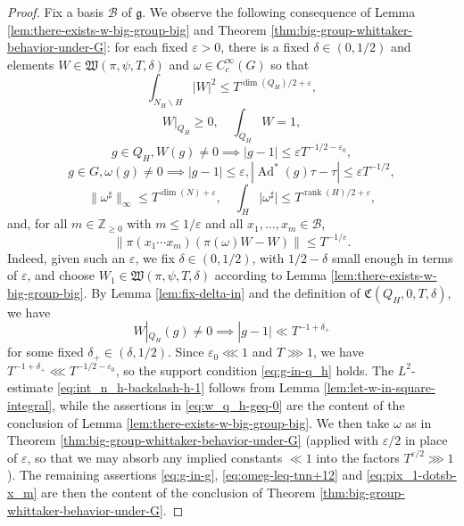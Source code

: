 \documentclass[reqno]{amsart}
\DeclareMathOperator{\Ad}{Ad}
\def\eps{\varepsilon}
\DeclareMathOperator{\rank}{rank}
\theoremstyle{plain} \newtheorem{theorem} {Theorem}
\theoremstyle{definition} \newtheorem{definition} [theorem] {Definition}
\theoremstyle{itplain} %
\numberwithin{equation}{section}
\numberwithin{theorem}{section}
\renewcommand{\geq}{\geqslant}
\renewcommand{\leq}{\leqslant}
\begin{document}
\begin{proof}
  Fix a basis $\mathcal{B}$ of $\mathfrak{g}$.  We observe the following consequence of Lemma \ref{lem:there-exists-w-big-group-big} and Theorem \ref{thm:big-group-whittaker-behavior-under-G}: for each fixed $\eps > 0$, there is a fixed $\delta \in (0,1/2)$ and elements $W \in \mathfrak{W}(\pi,\psi,T,\delta)$ and $\omega \in C_c^\infty(G)$ so that
  \begin{equation}\label{eq:int_n_h-backslash-h-1}
    \int_{N_H \backslash H} |W|^2 \leq   T^{\dim(Q_H)/2 + \eps},
  \end{equation}
  \begin{equation}\label{eq:w_q_h-geq-0}
    W|_{Q_H} \geq 0, \quad \int_{Q_H} W =  1,
  \end{equation}
  \begin{equation}\label{eq:g-in-q_h}
    g \in Q_H, W(g) \neq 0 \implies |g - 1| \leq \eps T^{-1/2-\eps_0},
  \end{equation}
  \begin{equation}\label{eq:g-in-g}
    g \in G, \omega(g) \neq 0 \implies |g - 1| \leq \eps, |\Ad^*(g) \tau - \tau| \leq \eps T^{-1/2},
  \end{equation}
  \begin{equation}\label{eq:omeg-leq-tnn+12}
    \|\omega^{\sharp}\|_{\infty} \leq T^{\dim(N) + \eps}, \quad
    \int_H \lvert \omega^\sharp \rvert \leq T^{\rank(H)/2+\eps},
  \end{equation}
  and, for all $m \in \mathbb{Z}_{\geq 0}$ with $m \leq 1/\eps$ and all $x_1,\dotsc,x_m \in \mathcal{B}$,
  \begin{equation}\label{eq:pix_1-dotsb-x_m}
    \|\pi(x_1 \dotsb x_m) (\pi(\omega) W - W)\| \leq T^{-1/\eps}.
  \end{equation}
  Indeed, given such an $\eps$, we fix $\delta \in (0,1/2)$, with $1/2 - \delta$ small enough in terms of $\eps$, and choose $W_1 \in \mathfrak{W}(\pi,\psi,T,\delta)$ according to Lemma \ref{lem:there-exists-w-big-group-big}.  By Lemma \ref{lem:fix-delta-in} and the definition of $\mathfrak{C}(Q_H,0,T,\delta)$, we have
  \begin{equation*}
W|_{Q_H}(g) \neq 0 \implies |g - 1| \ll T^{-1+\delta_+}
\end{equation*}
for some fixed $\delta_+ \in (\delta,1/2)$.  Since $\eps_0 \lll 1$ and $T \ggg 1$, we have $T^{-1+\delta_+} \lll T^{-1/2-\eps_0}$, so the support condition \eqref{eq:g-in-q_h} holds.  The $L^2$-estimate \eqref{eq:int_n_h-backslash-h-1} follows from Lemma \ref{lem:let-w-in-square-integral}, while the assertions in \eqref{eq:w_q_h-geq-0} are the content of the conclusion of Lemma \ref{lem:there-exists-w-big-group-big}.  We then take $\omega$ as in Theorem \ref{thm:big-group-whittaker-behavior-under-G} (applied with $\eps/2$ in place of $\eps$, so that we may absorb any implied constants $\ll 1$ into the factors $T^{\eps/2} \ggg 1$).  The remaining assertions \eqref{eq:g-in-g}, \eqref{eq:omeg-leq-tnn+12} and \eqref{eq:pix_1-dotsb-x_m} are then the content of the conclusion of Theorem \ref{thm:big-group-whittaker-behavior-under-G}.


\end{proof}
\end{document}
